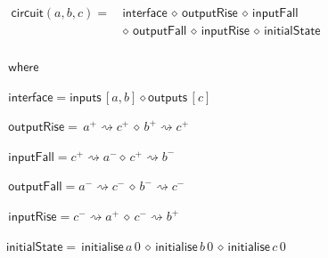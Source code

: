 \documentclass[british,compsoc]{IEEEtran}
\begin{document}
\begin{minipage}[t]{1\columnwidth}%

\begin{flushleft}
$\begin{aligned}\mathsf{circuit}(a, b, c)=&\mathsf{\,interface}\,\diamond \mathsf{\, outputRise}\,\diamond\,\mathsf{inputFall}\,\\
&\diamond\,\mathsf{outputFall}\,\diamond \mathsf{\, inputRise}\,\diamond\,\mathsf{initialState}\\
\end{aligned}
$

$\,\mathsf{where}$
\par\end{flushleft}

\begin{flushleft}
$\,\mathsf{interface}=\mathsf{inputs}\,[a,b]\diamond\mathsf{outputs}\,[c]$
\par\end{flushleft}

\begin{flushleft}
$\,\mathsf{outputRise}=\,a^{+}\rightsquigarrow c^{+}\,\diamond\, b^{+}\rightsquigarrow c^{+}$
\par\end{flushleft}

\begin{flushleft}
$\,\mathsf{inputFall}=c ^ {+} \rightsquigarrow a^{-} \diamond\, c ^ {+} \rightsquigarrow b^{-}$
\par\end{flushleft}

\begin{flushleft}
$\,\mathsf{outputFall}= a^{-} \rightsquigarrow c^{-} \,\diamond\, b^{-} \rightsquigarrow c^{-}$
\par\end{flushleft}

\begin{flushleft}
$\,\mathsf{inputRise}=c^{-} \rightsquigarrow a^{+} \,\diamond\, c^{-} \rightsquigarrow b^{+}$
\par\end{flushleft}

\begin{flushleft}
$\mathsf{initialState}= \, \mathsf{initialise}\,a \, 0\,\diamond\,\mathsf{initialise}\,b \,0\,\diamond \, \mathsf{initialise}\,c \,0 \,$
\par\end{flushleft}

\end{minipage}
\end{document}

